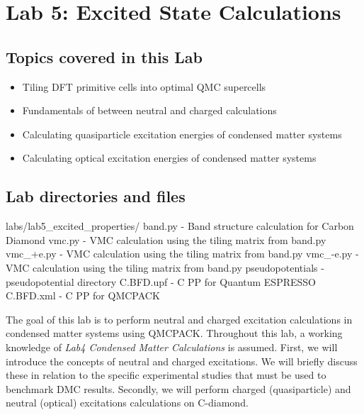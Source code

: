 \chapter{Lab 5: Excited State Calculations}
\label{chap:excited}


\section{Topics covered in this Lab}
\begin{itemize}
	\item{Tiling DFT primitive cells into optimal QMC supercells}
	\item{Fundamentals of  between neutral and charged calculations}
	\item{Calculating quasiparticle excitation energies of condensed matter systems}
	\item{Calculating optical excitation energies of condensed matter systems}
\end{itemize}

\section{Lab directories and files}

\begin{shade}
labs/lab5_excited_properties/
    band.py           - Band structure calculation for Carbon Diamond
    vmc.py            - VMC calculation using the tiling matrix from band.py
    vmc_+e.py         - VMC calculation using the tiling matrix from band.py
    vmc_-e.py         - VMC calculation using the tiling matrix from band.py
pseudopotentials      - pseudopotential directory
	C.BFD.upf         - C PP for Quantum ESPRESSO
	C.BFD.xml         - C PP for QMCPACK
\end{shade}

The goal of this lab is to perform neutral and charged excitation calculations in condensed matter systems using QMCPACK. 
Throughout this lab, a working knowledge of \textit{Lab4 Condensed Matter Calculations} is assumed. 
First, we will introduce the concepts of neutral and charged excitations. 
We will briefly discuss these in relation to the specific experimental studies that must be used to benchmark DMC results. 
Secondly, we will perform charged (quasiparticle) and neutral (optical) excitations calculations on C-diamond.

